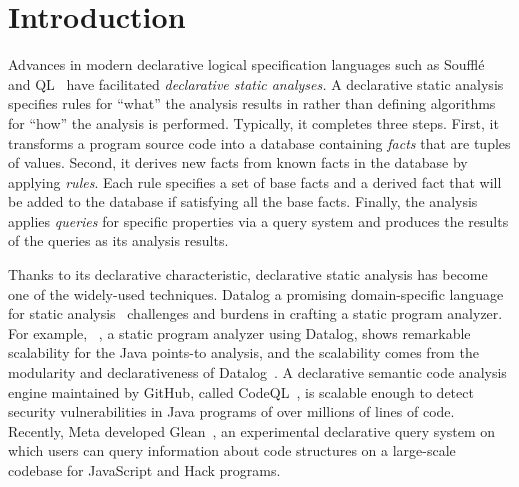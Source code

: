 \section{Introduction}
Advances in modern declarative logical specification languages such as
 Souffl\'{e}~\cite{souffle} and QL~\cite{ql2016} have facilitated
\emph{declarative static analyses.} A declarative static analysis specifies
rules for ``what'' the analysis results in rather than defining algorithms for
``how'' the analysis is performed.  Typically, it completes three steps.
First, it transforms a program source code into a database containing
\textit{facts} that are tuples of values.  Second, it derives new facts from
known facts in the database by applying {\it rules}.  Each rule specifies a set
of base facts and a derived fact that will be added to the database if
satisfying all the base facts.  Finally, the analysis applies {\it queries} for
specific properties via a query system and produces the results of the queries
as its analysis results.

Thanks to its declarative characteristic, declarative static analysis has
become one of the widely-used techniques.  Datalog  a promising
domain-specific language for static analysis~\cite{doop, codequest, allen2015D,
allen2015stagedD, alpuente2010D, dawson1996D, naik2006D, reps1994D,
smaragdakis2014D, whaley2005D, scholz2016}  challenges and
burdens in crafting a static program analyzer.  For example, \doop~\cite{doop},
a static program analyzer using Datalog, shows remarkable scalability for the
Java points-to analysis, and the scalability comes from the modularity and
declarativeness of Datalog~\cite{doopWorkshop}.
 A declarative semantic code
analysis engine maintained by GitHub, called CodeQL~\cite{codeql}, is scalable
enough to detect security vulnerabilities in Java programs of over millions of
lines of code.  Recently, Meta developed Glean~\cite{glean}, an experimental
declarative query system on which users can query information about code
structures on a large-scale codebase for JavaScript and Hack programs.

